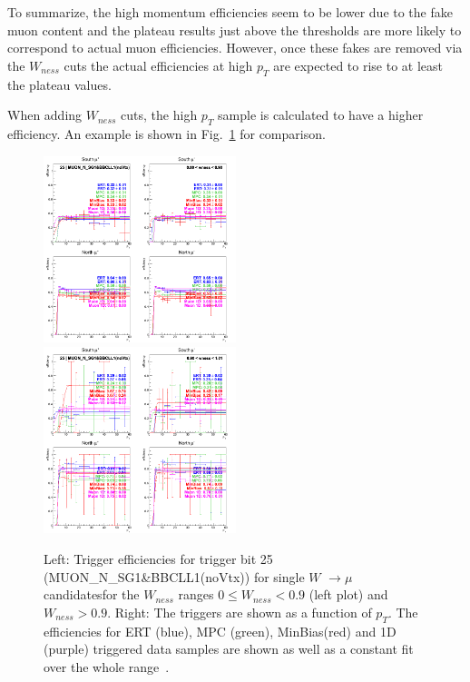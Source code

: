 To summarize, the high momentum efficiencies seem to be lower due to the fake
muon content and the plateau results just above the thresholds are more likely
to correspond to actual muon efficiencies. However, once these fakes are removed
via the $W_{ness}$ cuts the actual efficiencies at high $p_T$
are expected to rise to at least the plateau values.  

When adding $W_{ness}$ cuts, the high $p_T$ sample is calculated to have a
higher efficiency. An example is shown in
Fig.~\ref{fig:run13_trigeffiptlowhighpt} for comparison.

\begin{figure}[ht]
  \centering
  \includegraphics[width=0.5\textwidth]{./figures/run13_trigeffipt_iw0_trig25_lin.png}
  \includegraphics[width=0.5\textwidth]{./figures/run13_trigeffipt_iw1_trig25_lin.png}
  \caption{
    Left: Trigger efficiencies for trigger bit 25 (MUON\_N\_SG1\&BBCLL1(noVtx))
    for single $W$ $\rightarrow \mu$ candidatesfor the $W_{ness}$ ranges  $ 0
    \leq W_{ness} < 0.9 $ (left plot) and $W_{ness} > 0.9$. Right: The triggers
    are shown as a function of $p_T$. The efficiencies for ERT
    (blue), MPC (green), MinBias(red) and 1D (purple) triggered data samples are
    shown as well as a constant fit over the whole range~\cite{Seidl2014}.
  }
  \label{fig:run13_trigeffiptlowhighpt} 
\end{figure}

